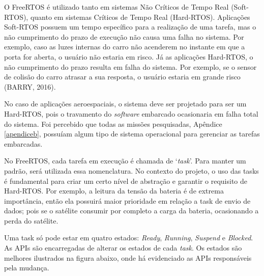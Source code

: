O FreeRTOS é utilizado tanto em sistemas Não Críticos de Tempo Real (Soft-RTOS), quanto em sistemas Críticos de Tempo Real (Hard-RTOS). Aplicações Soft-RTOS possuem um tempo específico para a realização de uma tarefa, mas o não cumprimento do prazo de execução não causa uma falha no sistema. Por exemplo, caso as luzes internas do carro não acenderem no instante em que a porta for aberta, o usuário não estaria em risco. Já as aplicações Hard-RTOS, o não cumprimento do prazo resulta em falha do sistema. Por exemplo, se o sensor de colisão do carro atrasar a sua resposta, o usuário estaria em grande risco (BARRY, 2016).

No caso de aplicações aeroespaciais, o sistema deve ser projetado para ser um Hard-RTOS, pois o travamento do \textit{software} embarcado ocasionaria em falha total do sistema. Foi percebido que todas as missões pesquisadas, Apêndice \ref{apendiceb}, possuíam algum tipo de sistema operacional para gerenciar as tarefas embarcadas.

No FreeRTOS, cada tarefa em execução é chamada de ‘\textit{task}’. Para manter um padrão, será utilizada essa nomenclatura. No contexto do projeto, o uso das tasks é fundamental para criar um certo nível de abstração e garantir o requisito de Hard-RTOS. Por exemplo, a leitura da tensão da bateria é de extrema importância, então ela possuirá maior prioridade em relação a task de envio de dados; pois se o satélite consumir por completo a carga da bateria, ocasionando a perda do satélite.

Uma task só pode estar em quatro estados: \textit{Ready}, \textit{Running}, \textit{Suspend} e \textit{Blocked}. As APIs são encarregadas de alterar os estados de cada \textit{task}. Os estados são melhores ilustrados na figura abaixo, onde há evidenciado as APIs responsáveis pela mudança.

